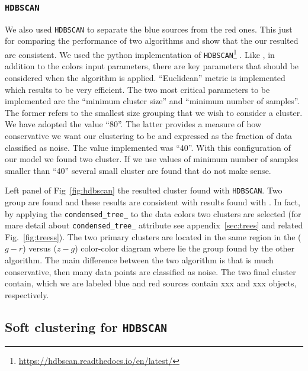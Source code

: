\documentclass[fleqn,usenatbib]{mnras}
\begin{document}
{\subsubsection{\texttt{HDBSCAN}}

We also used \texttt{HDBSCAN} to separate the blue sources from the red ones. This just for
comparing the performance of two algorithms and show that the our resulted are consistent.
We used the python implementation of \texttt{HDBSCAN}\footnote{\url{https://hdbscan.readthedocs.io/en/latest/}}
\citep{McInnes:2017}. Like , in addition to the colors input
parameters,  there are key parameters that should be considered  when the algorithm is
applied. ``Euclidean'' metric is implemented which results to be very efficient. The two most
critical parameters to be implemented are the ``minimum cluster size'' and ``minimum number
of samples''. The former refers to the smallest size grouping that we wish to consider a cluster.
We have adopted the value ``80''. The latter provides a measure of how conservative we want our
clustering to be and expressed as the fraction of data classified as noise.
The value implemented was ``40''. With this configuration of our model we found
two cluster. If we use values of minimum number of samples smaller than ``40'' several small
cluster are found that do not make sense.

Left panel of Fig~\ref{fig:hdbscan} the resulted cluster found with \texttt{HDBSCAN}. Two group are
found and these results are consistent with results found with  .
In fact, by applying the
\texttt{condensed\_tree\_} to the data colors two clusters are selected (for mare detail about
\texttt{condensed\_tree\_} attribute see appendix~\ref{sec:trees} and related
Fig.~\ref{fig:treess}). The two primary clusters are located in the same region in
the ($g - r$) versus ($z - g$) color-color diagram where lie the group found by the other algorithm.
The main difference between the two algorithm is that  
is much conservative, then many data points are classified as noise. The two final cluster
contain, which we are labeled blue and red sources contain xxx and xxx objects, respectively.

\subsection{Soft clustering for \texttt{HDBSCAN}}

}
\end{document}
